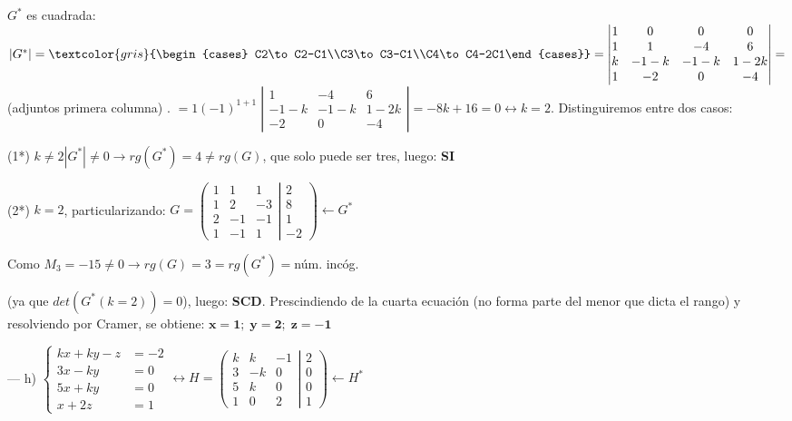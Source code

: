 \begin{proofw}
\noindent $G^*$ es cuadrada: $|G^*|=\textcolor{gris}{\begin{cases}  C2\to C2-C1\\C3\to C3-C1\\C4\to C4-2C1\end{cases}}=\left| \begin{matrix}   1&0&0&0\\1&1&-4&6\\k&-1-k&-1-k&1-2k\\1&-2&0&-4\end{matrix} \right|= $ \textcolor{gris}{\scriptsize{(adjuntos primera columna)} \normalsize{.}} $= 1(-1)^{1+1}\; \left| \begin{matrix}   1&-4&6\\-1-k&-1-k&1-2k\\-2&0&-4\end{matrix} \right|=-8k+16=0 \leftrightarrow k=2$. Distinguiremos entre dos casos:

\noindent (1*) $k\neq 2 |G^*|\neq 0 \to rg(G^*)=4\neq rg(G)$, que solo puede ser tres, luego: \textbf{SI}

\noindent (2*) $k=2$, particularizando: $G=\left( \begin{matrix}   \boxed{1}&\boxed{1}&\boxed{1}\\\boxed{1}&\boxed{2}&\boxed{-3}\\\boxed{2}&\boxed{-1}&\boxed{-1}\\1&-1&1     \end{matrix} \right|  \left.    \begin{matrix}    2\\8\\1\\-2\end{matrix} \right) \leftarrow G^*$

\noindent Como $\boxed{M_3}=-15\neq 0 \to rg(G)=3=rg(G^*)=$núm. incóg. 

\noindent \textcolor{gris}{(ya que $det(G^*(k=2))=0$)}, luego: \textbf{SCD}. Prescindiendo de la cuarta ecuación (no forma parte del menor que dicta el rango) y resolviendo por Cramer, se obtiene: $\boldsymbol{x=1;\; y=2; \; z=-1}$ 


\noindent --- h) $\begin{cases}   kx+ky-z&=-2\\3x-ky&=0\\5x+ky&=0\\x+2z&=1  \end{cases} \leftrightarrow H=\left( \begin{matrix}   k&k&-1\\3&-k&0\\5&k&0\\1&0&2     \end{matrix} \right|  \left.    \begin{matrix}   2\\0\\0\\1 \end{matrix} \right) \leftarrow H^*$


\end{proofw}
